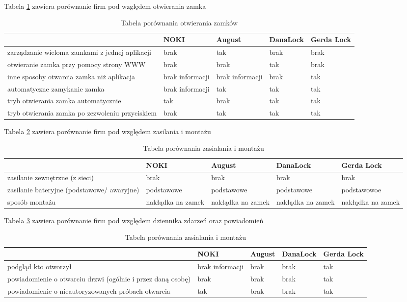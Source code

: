 	Tabela \ref{tab:porownanie1} zawiera porównanie firm pod względem otwierania zamka
	\begin{longtable}[!ht]{|p{4cm}|p{}|p{}|p{}|p{}|} 
		\caption{Tabela porównania otwierania zamków}
		\label{tab:porownanie1}\\
		\hline	
		 & NOKI & August & DanaLock & Gerda Lock  \\	\hline
		 zarządzanie wieloma zamkami z jednej aplikacji
		 & brak & tak & brak & brak \\	\hline
		otwieranie zamka przy pomocy strony WWW
		& brak & brak & tak & brak \\	\hline
		inne sposoby otwarcia zamka niż aplikacja
		& brak informacji& brak informacji & brak & tak \\	\hline
		automatyczne zamykanie zamka
		& brak informacji& tak & tak & tak   \\	\hline
		tryb otwierania zamka automatycznie
		& tak& brak & tak & tak \\	\hline	
		tryb otwierania zamka po zezwoleniu przyciskiem
		& brak & tak & tak & tak \\		\hline
	\end{longtable}


 
 	Tabela \ref{tab:porownanie2} zawiera porównanie firm pod względem zasilania i montażu
 \begin{longtable}[!ht]{|p{4cm}|p{}|p{}|p{}|p{}|} 
 	\caption{Tabela porównania zasialania i montażu}
 	\label{tab:porownanie2}\\
 	\hline	
 	& NOKI & August & DanaLock & Gerda Lock  \\	\hline
 	zasilanie zewnętrzne (z sieci)	
 	& brak & brak & brak & brak \\	\hline
	 zasilanie bateryjne (podstawowe/ awaryjne)	
	 & podstawowe & podstawowe & podstawowe & podstawowoe \\	\hline
 	sposób montażu	
 	& nakłądka na zamek & nakłądka na zamek & nakłądka na zamek & nakłądka na zamek \\	\hline
 \end{longtable}
 



Tabela \ref{tab:porownanie3} zawiera porównanie firm pod względem dziennika zdarzeń oraz powiadomień
\begin{longtable}[!ht]{|p{4cm}|p{}|p{}|p{}|p{}|} 
	\caption{Tabela porównania zasialania i montażu}
	\label{tab:porownanie3}\\
	\hline	
	& NOKI & August & DanaLock & Gerda Lock  \\	\hline
	podgląd kto otworzył	
	& brak informacji & brak & brak & tak \\	\hline
	
	
	powiadomienie o otwarciu drzwi (ogólnie i przez daną osobę)
	& brak & brak & brak & tak \\	\hline
	
	
	powiadomienie o nieautoryzowanych próbach otwarcia
	& tak & brak & brak & tak \\	\hline
\end{longtable}

